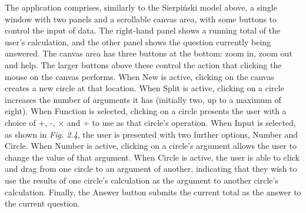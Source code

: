 \documentclass[12pt,twoside,notitlepage,xetex]{report}
\begin{document}
The application comprises, similarly to the Sierpiński model above, a single
window with two panels and a scrollable canvas area, with some buttons to
control the input of data.  The right-hand panel shows a running total of the
user's calculation, and the other panel shows the question currently being
answered.  The canvas area has three buttons at the bottom: zoom in, zoom out
and help.  The larger buttons above these control the action that clicking the
mouse on the canvas performs.  When {\sfapp New} is active, clicking on the
canvas creates a new circle at that location.  When {\sfapp Split} is active,
clicking on a circle increases the number of arguments it has (initially two,
up to a maximum of eight).  When {\sfapp Function} is selected, clicking on a
circle presents the user with a choice of +, -, × and ÷ to use as that circle's
operation.  When {\sfapp Input} is selected, as shown in \emph{Fig. 2.4}, the
user is presented with two further options, {\sfapp Number} and
{\sfapp Circle}.  When {\sfapp Number} is active, clicking on a circle's
argument allows the user to change the value of that argument.  When
{\sfapp Circle} is active, the user is able to click and drag from one circle
to an argument of another, indicating that they wish to use the results of one
circle's calculation as the argument to another circle's calculation.  Finally,
the {\sfapp Answer} button submits the current total as the answer to the
current question.
\end{document}
